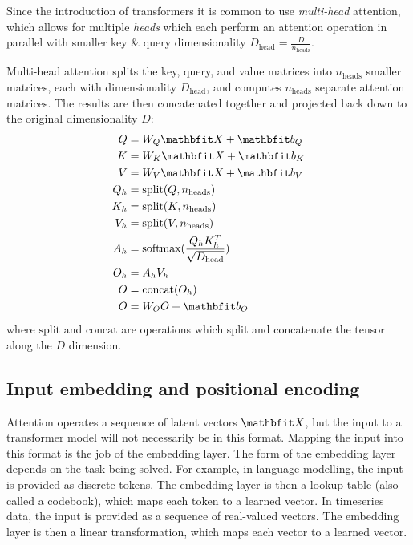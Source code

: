 Since the introduction of transformers it is common to use \textit{multi-head} attention, which allows for multiple \textit{heads} which each perform an attention operation in parallel with smaller key \& query dimensionality $D_{\text{head}} = \frac{D}{ n_{\text{heads}}}$.

Multi-head attention splits the key, query, and value matrices into $n_{\text{heads}}$ smaller matrices, each with dimensionality $D_{\text{head}}$, and computes $n_{\text{heads}}$ separate attention matrices. The results are then concatenated together and projected back down to the original dimensionality $D$:
\begin{align}
\begin{aligned}
\label{eqn:multi-head-attn}
Q &= W_{Q} \X + \vb_{Q} \\
K &= W_{K} \X + \vb_{K} \\
V &= W_{V} \X + \vb_{V} \\
Q_{h} &= \text{split}(Q, n_{\text{heads}}) \\
K_{h} &= \text{split}(K, n_{\text{heads}}) \\
V_{h} &= \text{split}(V, n_{\text{heads}}) \\
A_{h} &= \text{softmax}(\frac{Q_{h}K_{h}^T}{\sqrt{D_{\text{head}}}}) \\
O_{h} &= A_{h}V_{h} \\
O &= \text{concat}(O_{h}) \\
O &= W_{O}O + \vb_{O}
\end{aligned}
\end{align}
where $\text{split}$ and $\text{concat}$ are operations which split and concatenate the tensor along the $D$ dimension.

\subsection{Input embedding and positional encoding}
\label{ss:transformer-inputs}

Attention operates a sequence of latent vectors $\X$, but the input to a transformer model will not necessarily be in this format. Mapping the input into this format is the job of the embedding layer. The form of the embedding layer depends on the task being solved. For example, in language modelling, the input is provided as discrete tokens. The embedding layer is then a lookup table (also called a codebook), which maps each token to a learned vector. In timeseries data, the input is provided as a sequence of real-valued vectors. The embedding layer is then a linear transformation, which maps each vector to a learned vector.

